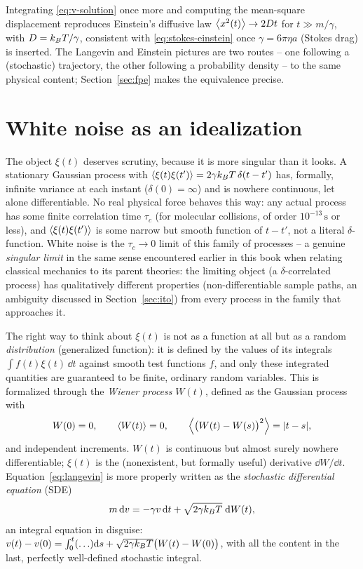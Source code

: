 Integrating \eqref{eq:v-solution} once more and computing the mean-square
displacement reproduces Einstein's diffusive law
$\left\langle x^2(t) \right\rangle\to 2Dt$ for $t \gg m/\gamma$, with
$D = k_{B} T/\gamma$, consistent with \eqref{eq:stokes-einstein} once
$\gamma = 6\pi\eta a$ (Stokes drag) is inserted. The Langevin and Einstein
pictures are two routes -- one following a (stochastic) trajectory, the
other following a probability density -- to the same physical content;
Section~\ref{sec:fpe} makes the equivalence precise.

\section{White noise as an idealization}
\label{sec:white-noise}

The object $\xi(t)$ deserves scrutiny, because it is more singular than it
looks. A stationary Gaussian process with $\left\langle \xi(t)\xi(t') \right\rangle =
2\gamma k_{B} T\,\delta(t-t')$ has, formally, infinite variance at each
instant ($\delta(0) = \infty$) and is nowhere continuous, let alone
differentiable. No real physical force behaves this way: any actual
process has some finite correlation time $\tau_c$ (for molecular
collisions, of order $10^{-13}\,\mathrm{s}$ or less), and
$\left\langle \xi(t)\xi(t') \right\rangle$ is some narrow but smooth function of $t-t'$, not a
literal $\delta$-function. White noise is the $\tau_c \to 0$ limit of this
family of processes -- a genuine \emph{singular limit} in the same sense
encountered earlier in this book when relating classical mechanics to its
parent theories: the limiting object (a $\delta$-correlated process) has
qualitatively different properties (non-differentiable sample paths, an
ambiguity discussed in Section~\ref{sec:ito}) from every process in the
family that approaches it.

The right way to think about $\xi(t)$ is not as a function at all but as a
random \emph{distribution} (generalized function): it is defined by the
values of its integrals $\int f(t)\xi(t)\,\dd t$ against smooth test
functions $f$, and only these integrated quantities are guaranteed to be
finite, ordinary random variables. This is formalized through the
\emph{Wiener process} $W(t)$, defined as the Gaussian process with
\begin{equation}
W(0)=0,\qquad \left\langle W(t) \right\rangle = 0, \qquad \left\langle \bigl(W(t)-W(s)\bigr)^2 \right\rangle = |t-s|,
\end{equation}
and independent increments. $W(t)$ is continuous but almost surely
nowhere differentiable; $\xi(t)$ is the (nonexistent, but formally useful)
derivative $\dd W/\dd t$. Equation~\eqref{eq:langevin} is more properly
written as the \emph{stochastic differential equation} (SDE)
\begin{equation}
m\,\mathrm{d} v = -\gamma v\,\mathrm{d} t + \sqrt{2\gamma k_{B} T}\;\mathrm{d} W(t),
\label{eq:sde-langevin}
\end{equation}
an integral equation in disguise: $v(t) - v(0) = \int_0^t(\ldots)\mathrm{d} s +
\sqrt{2\gamma k_{B} T}\bigl(W(t)-W(0)\bigr)$, with all the content in the last,
perfectly well-defined stochastic integral.


